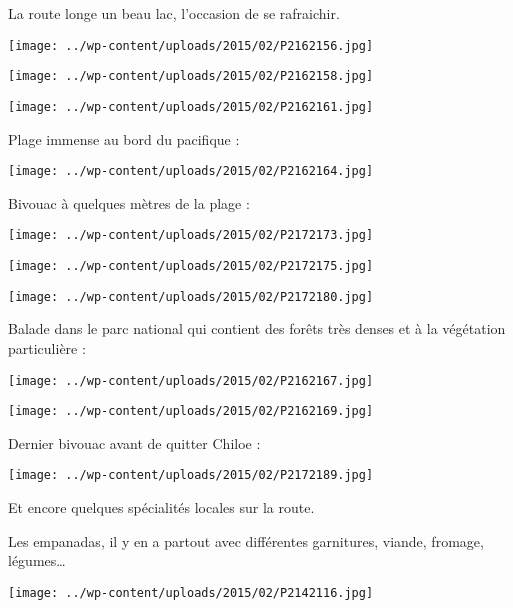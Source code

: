  La route longe un beau lac, l'occasion de se rafraichir.
\begin{center} \texttt{[image: ../wp-content/uploads/2015/02/P2162156.jpg]} \end{center}
\begin{center} \texttt{[image: ../wp-content/uploads/2015/02/P2162158.jpg]} \end{center}
\begin{center} \texttt{[image: ../wp-content/uploads/2015/02/P2162161.jpg]} \end{center}

\pagebreak
 Plage immense au bord du pacifique :
\begin{center} \texttt{[image: ../wp-content/uploads/2015/02/P2162164.jpg]} \end{center}

 Bivouac à quelques mètres de la plage :
\begin{center} \texttt{[image: ../wp-content/uploads/2015/02/P2172173.jpg]} \end{center}
\begin{center} \texttt{[image: ../wp-content/uploads/2015/02/P2172175.jpg]} \end{center}
\begin{center} \texttt{[image: ../wp-content/uploads/2015/02/P2172180.jpg]} \end{center}

\pagebreak
 Balade dans le parc national qui contient des forêts très denses et à la végétation particulière :
\begin{center} \texttt{[image: ../wp-content/uploads/2015/02/P2162167.jpg]} \end{center}
\begin{center} \texttt{[image: ../wp-content/uploads/2015/02/P2162169.jpg]} \end{center}

\pagebreak
  Dernier bivouac avant de quitter Chiloe :
\begin{center} \texttt{[image: ../wp-content/uploads/2015/02/P2172189.jpg]} \end{center}

 Et encore quelques spécialités locales sur la route.

 Les empanadas, il y en a partout avec différentes garnitures, viande, fromage, légumes…
\begin{center} \texttt{[image: ../wp-content/uploads/2015/02/P2142116.jpg]} \end{center}


